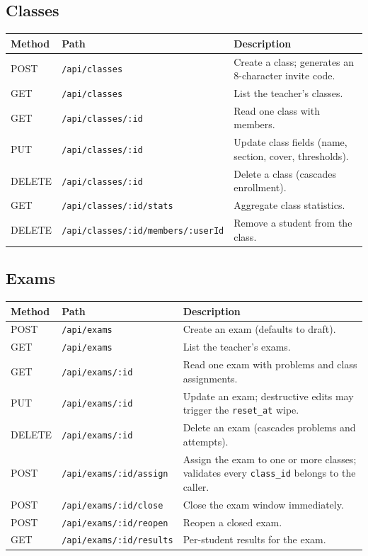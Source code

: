 \subsection{Classes}

\begin{xltabular}{\linewidth}{l >{\ttfamily\small\raggedright\arraybackslash}p{5.7cm} X}
  \toprule
  Method & Path & Description \\
  \midrule
  POST   & \texttt{/api/classes}                        & Create a class; generates an 8-character invite code. \\
  GET    & \texttt{/api/classes}                        & List the teacher's classes. \\
  GET    & \texttt{/api/classes/:id}                    & Read one class with members. \\
  PUT    & \texttt{/api/classes/:id}                    & Update class fields (name, section, cover, thresholds). \\
  DELETE & \texttt{/api/classes/:id}                    & Delete a class (cascades enrollment). \\
  GET    & \texttt{/api/classes/:id/stats}              & Aggregate class statistics. \\
  DELETE & \texttt{/api/classes/:id/members/:userId}    & Remove a student from the class. \\
  \bottomrule
\end{xltabular}

\subsection{Exams}

\begin{xltabular}{\linewidth}{l >{\ttfamily\small\raggedright\arraybackslash}p{5.7cm} X}
  \toprule
  Method & Path & Description \\
  \midrule
  POST   & \texttt{/api/exams}              & Create an exam (defaults to draft). \\
  GET    & \texttt{/api/exams}              & List the teacher's exams. \\
  GET    & \texttt{/api/exams/:id}          & Read one exam with problems and class assignments. \\
  PUT    & \texttt{/api/exams/:id}          & Update an exam; destructive edits may trigger the \texttt{reset\_at} wipe. \\
  DELETE & \texttt{/api/exams/:id}          & Delete an exam (cascades problems and attempts). \\
  POST   & \texttt{/api/exams/:id/assign}   & Assign the exam to one or more classes; validates every \texttt{class\_id} belongs to the caller. \\
  POST   & \texttt{/api/exams/:id/close}    & Close the exam window immediately. \\
  POST   & \texttt{/api/exams/:id/reopen}   & Reopen a closed exam. \\
  GET    & \texttt{/api/exams/:id/results}  & Per-student results for the exam. \\
  \bottomrule
\end{xltabular}

